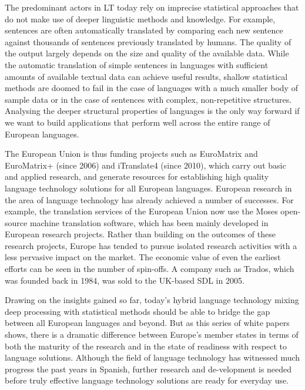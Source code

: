 \begin{multicols}{2}
The predominant actors in LT today rely on imprecise statistical approaches that do not make use of deeper linguistic methods and knowledge. For example, sentences are often automatically translated by comparing each new sentence against thousands of sentences previously translated by humans. The quality of the output largely depends on the size and quality of the available data. While the automatic translation of simple sentences in languages with sufficient amounts of available textual data can achieve useful results, shallow statistical methods are doomed to fail in the case of languages with a much smaller body of sample data or in the case of sentences with complex, non-repetitive structures. Analysing the deeper structural properties of languages is the only way forward if we want to build applications that perform well across the entire range of European languages.


The European Union is thus funding projects such as EuroMatrix and EuroMatrix+ (since 2006) and iTranslate4 (since 2010), which carry out basic and applied research, and generate resources for establishing high quality language technology solutions for all European languages. 
European research in the area of language technology has already achieved a number of successes. For example, the translation services of the European Union now use the Moses open-source machine translation software, which has been mainly developed in European research projects. Rather than building on the outcomes of these research projects, Europe has tended to pursue isolated research activities with a less pervasive impact on the market. The economic value of even the earliest efforts can be seen in the number of spin-offs. A company such as Trados, which was founded back in 1984, was sold to the UK-based SDL in 2005.


Drawing on the insights gained so far, today’s hybrid language technology mixing deep processing with statistical methods should be able to bridge the gap between all European languages and beyond. But as this series of white papers shows, there is a dramatic difference between Europe’s member states in terms of both the maturity of the research and in the state of readiness with respect to language solutions. Although the field of language technology has witnessed much progress the past years in Spanish, further research and de-velopment is needed before truly effective language technology solutions are ready for everyday use. 


\end{multicols}
